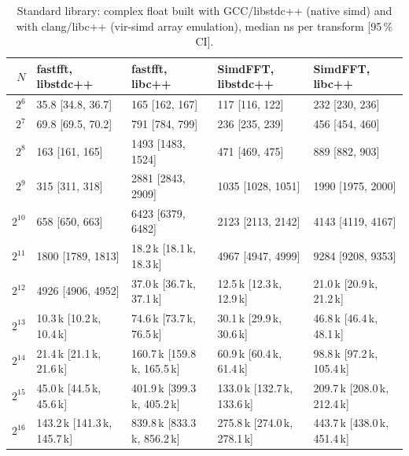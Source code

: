 \begin{table}[h]\centering
\caption{Standard library: complex float built with GCC/libstdc++ (native simd) and with clang/libc++ (vir-simd array
emulation), median ns per transform [95\,\% CI].}\label{tab:libcxx}
\begin{tabular}{rllll}\toprule
$N$ & fastfft, libstdc++ & fastfft, libc++ & SimdFFT, libstdc++ & SimdFFT, libc++\\\midrule
$2^{6}$ & 35.8 {\scriptsize[34.8, 36.7]} & 165 {\scriptsize[162, 167]} & 117 {\scriptsize[116, 122]} & 232 {\scriptsize[230, 236]}\\
$2^{7}$ & 69.8 {\scriptsize[69.5, 70.2]} & 791 {\scriptsize[784, 799]} & 236 {\scriptsize[235, 239]} & 456 {\scriptsize[454, 460]}\\
$2^{8}$ & 163 {\scriptsize[161, 165]} & 1493 {\scriptsize[1483, 1524]} & 471 {\scriptsize[469, 475]} & 889 {\scriptsize[882, 903]}\\
$2^{9}$ & 315 {\scriptsize[311, 318]} & 2881 {\scriptsize[2843, 2909]} & 1035 {\scriptsize[1028, 1051]} & 1990 {\scriptsize[1975, 2000]}\\
$2^{10}$ & 658 {\scriptsize[650, 663]} & 6423 {\scriptsize[6379, 6482]} & 2123 {\scriptsize[2113, 2142]} & 4143 {\scriptsize[4119, 4167]}\\
$2^{11}$ & 1800 {\scriptsize[1789, 1813]} & 18.2\,k {\scriptsize[18.1\,k, 18.3\,k]} & 4967 {\scriptsize[4947, 4999]} & 9284 {\scriptsize[9208, 9353]}\\
$2^{12}$ & 4926 {\scriptsize[4906, 4952]} & 37.0\,k {\scriptsize[36.7\,k, 37.1\,k]} & 12.5\,k {\scriptsize[12.3\,k, 12.9\,k]} & 21.0\,k {\scriptsize[20.9\,k, 21.2\,k]}\\
$2^{13}$ & 10.3\,k {\scriptsize[10.2\,k, 10.4\,k]} & 74.6\,k {\scriptsize[73.7\,k, 76.5\,k]} & 30.1\,k {\scriptsize[29.9\,k, 30.6\,k]} & 46.8\,k {\scriptsize[46.4\,k, 48.1\,k]}\\
$2^{14}$ & 21.4\,k {\scriptsize[21.1\,k, 21.6\,k]} & 160.7\,k {\scriptsize[159.8\,k, 165.5\,k]} & 60.9\,k {\scriptsize[60.4\,k, 61.4\,k]} & 98.8\,k {\scriptsize[97.2\,k, 105.4\,k]}\\
$2^{15}$ & 45.0\,k {\scriptsize[44.5\,k, 45.6\,k]} & 401.9\,k {\scriptsize[399.3\,k, 405.2\,k]} & 133.0\,k {\scriptsize[132.7\,k, 133.6\,k]} & 209.7\,k {\scriptsize[208.0\,k, 212.4\,k]}\\
$2^{16}$ & 143.2\,k {\scriptsize[141.3\,k, 145.7\,k]} & 839.8\,k {\scriptsize[833.3\,k, 856.2\,k]} & 275.8\,k {\scriptsize[274.0\,k, 278.1\,k]} & 443.7\,k {\scriptsize[438.0\,k, 451.4\,k]}\\

\end{tabular}
\end{table}
